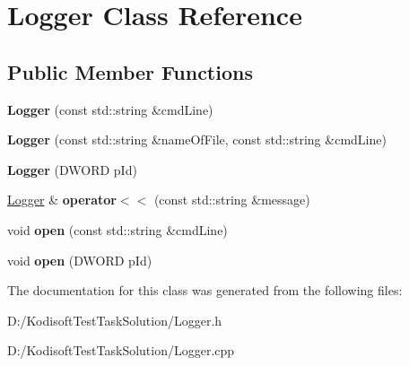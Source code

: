 \hypertarget{class_logger}{\section{Logger Class Reference}
\label{class_logger}
}
\subsection*{Public Member Functions}
\begin{DoxyCompactItemize}
\item 
\hypertarget{class_logger_a4364a5e0f1950aceccc46c255324c8fc}{{\bfseries Logger} (const std\+::string \&cmd\+Line)}\label{class_logger_a4364a5e0f1950aceccc46c255324c8fc}

\item 
\hypertarget{class_logger_ab3475d904c34f0f66e8f552ecaa4466d}{{\bfseries Logger} (const std\+::string \&name\+Of\+File, const std\+::string \&cmd\+Line)}\label{class_logger_ab3475d904c34f0f66e8f552ecaa4466d}

\item 
\hypertarget{class_logger_af3040da3e682ec204dd003dc17d325e3}{{\bfseries Logger} (D\+W\+O\+R\+D p\+Id)}\label{class_logger_af3040da3e682ec204dd003dc17d325e3}

\item 
\hypertarget{class_logger_ac49b98540a25beeace974a2262ea9b0e}{\hyperlink{class_logger}{Logger} \& {\bfseries operator$<$$<$} (const std\+::string \&message)}\label{class_logger_ac49b98540a25beeace974a2262ea9b0e}

\item 
\hypertarget{class_logger_a8e496df1b155ab2c128c48547d72f2d4}{void {\bfseries open} (const std\+::string \&cmd\+Line)}\label{class_logger_a8e496df1b155ab2c128c48547d72f2d4}

\item 
\hypertarget{class_logger_aea2256b8a0a64883064934a08e7b9eef}{void {\bfseries open} (D\+W\+O\+R\+D p\+Id)}\label{class_logger_aea2256b8a0a64883064934a08e7b9eef}

\end{DoxyCompactItemize}


The documentation for this class was generated from the following files\+:\begin{DoxyCompactItemize}
\item 
D\+:/\+Kodisoft\+Test\+Task\+Solution/Logger.\+h\item 
D\+:/\+Kodisoft\+Test\+Task\+Solution/Logger.\+cpp\end{DoxyCompactItemize}
